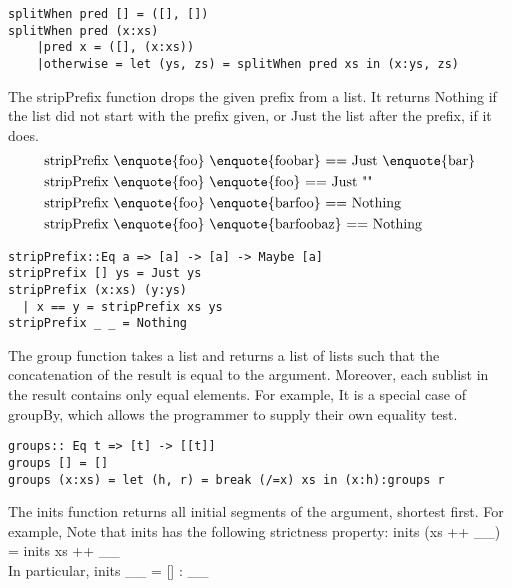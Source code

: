 \eqCode
\begin{lstlisting}[frame=single]
splitWhen pred [] = ([], [])
splitWhen pred (x:xs)
	|pred x = ([], (x:xs))
	|otherwise = let (ys, zs) = splitWhen pred xs in (x:ys, zs)
\end{lstlisting}

The stripPrefix function drops the given prefix from a list. It returns Nothing if the list did not start with the prefix given, or Just the list after the prefix, if it does.
\begin{align*}
	&\text{stripPrefix \enquote{foo} \enquote{foobar} == Just \enquote{bar}}\\
	&\text{stripPrefix \enquote{foo} \enquote{foo} == Just ""}\\
	&\text{stripPrefix \enquote{foo} \enquote{barfoo} == Nothing}\\
	&\text{stripPrefix \enquote{foo} \enquote{barfoobaz} == Nothing}
\end{align*}

\checkImpl
\begin{lstlisting}[frame=single]
stripPrefix::Eq a => [a] -> [a] -> Maybe [a]
stripPrefix [] ys = Just ys
stripPrefix (x:xs) (y:ys)
  | x == y = stripPrefix xs ys
stripPrefix _ _ = Nothing
\end{lstlisting}

The group function takes a list and returns a list of lists such that the concatenation of the result is equal to the argument. Moreover, each sublist in the result contains only equal elements. For example,
It is a special case of groupBy, which allows the programmer to supply their own equality test.

\eqCode
\label{haskellBreak}
\begin{lstlisting}[frame=single]
groups:: Eq t => [t] -> [[t]]
groups [] = []
groups (x:xs) = let (h, r) = break (/=x) xs in (x:h):groups r
\end{lstlisting}

The inits function returns all initial segments of the argument, shortest first. For example,
Note that inits has the following strictness property: inits (xs ++ \_\textbar\_) = inits xs ++ \_\textbar\_ \\
In particular, inits \_\textbar\_ = [] : \_\textbar\_

